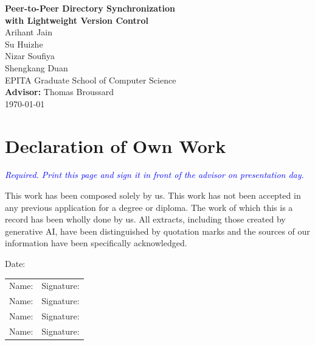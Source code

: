 \documentclass[12pt,oneside]{report}
\newcommand{\note}[1]{\textcolor{blue}{\textit{#1}}}
\begin{document}
\begin{titlepage}
    \centering
    \vspace*{3cm}
    {\LARGE \textbf{Peer-to-Peer Directory Synchronization\\with Lightweight Version Control}}\\
    \vspace{1.5cm}
    \large
    Arihant Jain \\ Su Huizhe \\ Nizar Soufiya \\ Shengkang Duan \\
    \vspace{1.5cm}
    EPITA Graduate School of Computer Science\\
    \vspace{1cm}
    \textbf{Advisor:} Thomas Broussard\\
    \vfill
    \today
\end{titlepage}

\chapter*{Declaration of Own Work}
\note{Required. Print this page and sign it in front of the advisor on presentation day.}

This work has been composed solely by us.
This work has not been accepted in any previous application for a degree or diploma.
The work of which this is a record has been wholly done by us.
All extracts, including those created by generative AI, have been distinguished by quotation marks and the sources of our information have been specifically acknowledged.

\vspace{1cm}
Date: \underline{\hspace{4cm}}

\begin{tabular}{p{6cm} p{6cm}}
Name: \underline{\hspace{4cm}} & Signature: \underline{\hspace{4cm}} \\[0.8cm]
Name: \underline{\hspace{4cm}} & Signature: \underline{\hspace{4cm}} \\[0.8cm]
Name: \underline{\hspace{4cm}} & Signature: \underline{\hspace{4cm}} \\[0.8cm]
Name: \underline{\hspace{4cm}} & Signature: \underline{\hspace{4cm}} \\
\end{tabular}
\end{document}

